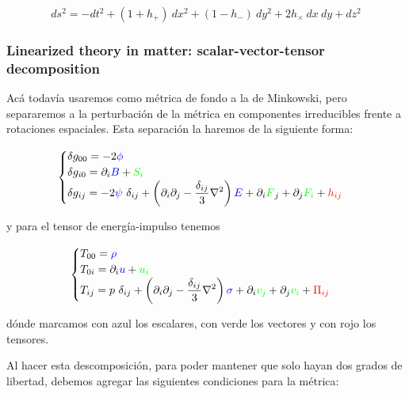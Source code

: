 \begin{equation}
    ds^2 = - dt^2 + (1 + h_+) \ dx^2 + (1 - h_- ) \ dy^2 + 2 h_\times \ dx \ dy + dz^2
\end{equation}

\subsubsection{Linearized theory in matter: scalar-vector-tensor decomposition}

Acá todavía usaremos como métrica de fondo a la de Minkowski, pero separaremos a la perturbación de la métrica en componentes irreducibles frente a rotaciones espaciales. Esta separación la haremos de la siguiente forma: 

\begin{equation}
    \begin{cases}
        \displaystyle \delta g_{00} = - 2 \textcolor{blue}{\phi}\\
        \displaystyle \delta g_{i0} = \partial_i \textcolor{blue}{B} + \textcolor{green}{S_i} \\
        \displaystyle \delta g_{ij} = - 2 \textcolor{blue}{\psi} \ \delta_{ij} + \left( \partial_i \partial_j - \frac{\delta_{ij}}{3} \nabla^2 \right) \textcolor{blue}{E} + \partial_i \textcolor{green}{F}_j + \partial_j \textcolor{green}{F_i} + \textcolor{red}{h_{ij}}
    \end{cases}
\end{equation}

\noindent
y para el tensor de energía-impulso tenemos

\begin{equation}
    \begin{cases}
        \displaystyle T_{00} = \textcolor{blue}{\rho}\\
        \displaystyle T_{0i} = \partial_i \textcolor{blue}{u} + \textcolor{green}{u_i} \\
        \displaystyle T_{ij} = p \ \delta_{ij} + \left( \partial_i \partial_j - \frac{\delta_{ij}}{3} \nabla^2 \right) \textcolor{blue}{\sigma} + \partial_i \textcolor{green}{v_j} + \partial_j \textcolor{green}{v_i} + \textcolor{red}{\Pi_{ij}}
    \end{cases}
\end{equation}

\noindent
dónde marcamos con azul los escalares, con verde los vectores y con rojo los tensores.

Al hacer esta descomposición, para poder mantener que solo hayan dos grados de libertad, debemos agregar las siguientes condiciones para la métrica:

